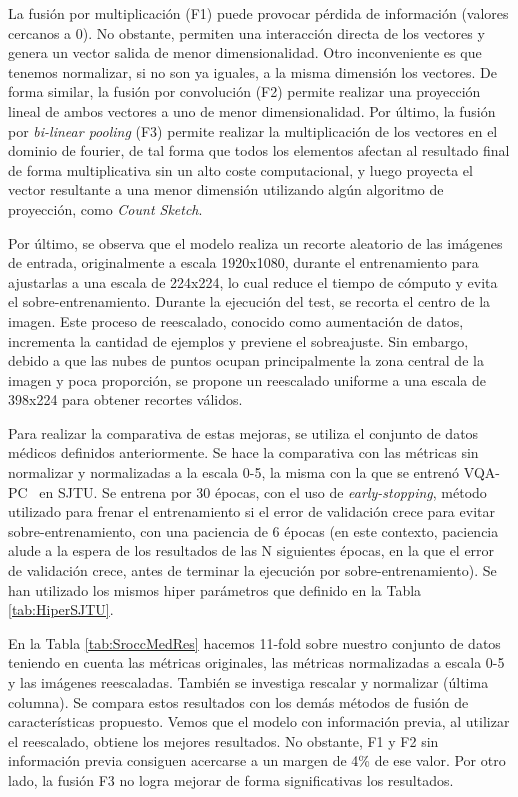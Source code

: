 La fusión por multiplicación (F1) puede provocar pérdida de información (valores cercanos a 0). 
No obstante, permiten una interacción directa de los vectores y genera un vector salida 
de menor dimensionalidad. Otro inconveniente es que tenemos normalizar, si no son 
ya iguales, a la misma dimensión los vectores. De forma similar, la fusión por convolución (F2)
permite realizar una proyección lineal de ambos vectores a uno de menor dimensionalidad. 
Por último, la fusión por \emph{bi-linear pooling} (F3) permite realizar la multiplicación de 
los vectores en el dominio de fourier, de tal forma que todos los elementos afectan al 
resultado final de forma multiplicativa sin un alto coste computacional, y luego proyecta 
el vector resultante a una menor dimensión utilizando algún algoritmo de proyección, 
como \emph{Count Sketch}. 

Por último, se observa que el modelo realiza un recorte aleatorio de las imágenes de entrada, 
originalmente a escala 1920x1080, durante el entrenamiento 
para ajustarlas a una escala de 224x224, lo cual reduce el tiempo de cómputo y 
evita el sobre-entrenamiento. Durante la ejecución del test, se recorta el centro de la imagen. 
Este proceso de reescalado, conocido como aumentación de datos, incrementa la cantidad de ejemplos 
y previene el sobreajuste. Sin embargo, debido a que las nubes de puntos ocupan principalmente 
la zona central de la imagen y poca proporción, se propone un reescalado uniforme a una escala de 
398x224 para obtener recortes válidos.

Para realizar la comparativa de estas mejoras, se utiliza el conjunto de datos 
médicos definidos anteriormente. Se hace la comparativa con las métricas sin 
normalizar y normalizadas a la escala 0-5, la misma con la que se entrenó VQA-PC~\cite{VQA-PC} en SJTU. 
Se entrena por 30 épocas, con el uso de \emph{early-stopping}, método utilizado para frenar el entrenamiento 
si el error de validación crece para evitar sobre-entrenamiento, con una paciencia 
de 6 épocas (en este contexto, paciencia alude a la espera de los resultados de 
las N siguientes épocas, en la que el error de validación crece, antes de terminar 
la ejecución por sobre-entrenamiento). 
Se han utilizado los mismos hiper parámetros que definido en la Tabla \ref{tab:HiperSJTU}.

En la Tabla \ref{tab:SroccMedRes} hacemos 11-fold sobre nuestro conjunto de datos teniendo en cuenta las métricas originales, las métricas
normalizadas a escala 0-5 y las imágenes reescaladas. También se investiga rescalar y normalizar (última columna).
Se compara estos resultados con los demás métodos de fusión de características propuesto.
Vemos que el modelo con información previa, al utilizar el reescalado, obtiene los mejores resultados.
No obstante, F1 y F2 sin información previa consiguen acercarse a un margen de 4\% de ese valor. 
Por otro lado, la fusión F3 no logra mejorar de forma significativas los resultados. 

